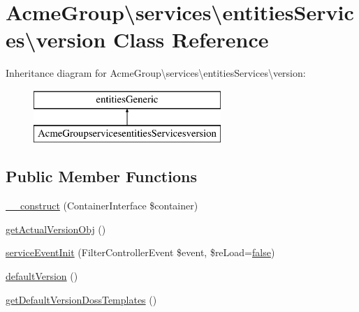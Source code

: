 \hypertarget{class_acme_group_1_1services_1_1entities_services_1_1version}{\section{Acme\+Group\textbackslash{}services\textbackslash{}entities\+Services\textbackslash{}version Class Reference}
\label{class_acme_group_1_1services_1_1entities_services_1_1version}
}
Inheritance diagram for Acme\+Group\textbackslash{}services\textbackslash{}entities\+Services\textbackslash{}version\+:\begin{figure}[H]
\begin{center}
\leavevmode
\includegraphics[height=2.000000cm]{class_acme_group_1_1services_1_1entities_services_1_1version}
\end{center}
\end{figure}
\subsection*{Public Member Functions}
\begin{DoxyCompactItemize}
\item 
\hyperlink{class_acme_group_1_1services_1_1entities_services_1_1version_a1265743a4fa16458a542abba74ac0d74}{\+\_\+\+\_\+construct} (Container\+Interface \$container)
\item 
\hyperlink{class_acme_group_1_1services_1_1entities_services_1_1version_a7265409763071d9404a7b71f6c0afefa}{get\+Actual\+Version\+Obj} ()
\item 
\hyperlink{class_acme_group_1_1services_1_1entities_services_1_1version_ae2e1b7429c5612f957e737ae6bc531c2}{service\+Event\+Init} (Filter\+Controller\+Event \$event, \$re\+Load=\hyperlink{validate_8js_a5df37b7f02e5cdc7d9412b7f872b8e01}{false})
\item 
\hyperlink{class_acme_group_1_1services_1_1entities_services_1_1version_a87539264c8e6cc51d133bc66ca166776}{default\+Version} ()
\item 
\hyperlink{class_acme_group_1_1services_1_1entities_services_1_1version_a46318b9835f859372a0723a237e3fe70}{get\+Default\+Version\+Doss\+Templates} ()
\end{DoxyCompactItemize}
